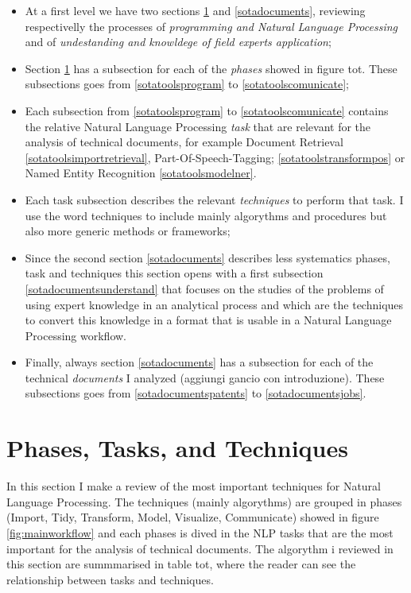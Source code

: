 \documentclass[]{book}
\providecommand{\tightlist}{%
  \setlength{\itemsep}{0pt}\setlength{\parskip}{0pt}}
\theoremstyle{definition}
\theoremstyle{definition}
\theoremstyle{definition}
\theoremstyle{remark}
\begin{document}
\begin{itemize}
\tightlist
\item
  At a first level we have two sections \ref{sotatools} and
  \ref{sotadocuments}, reviewing respectivelly the processes of
  \emph{programming and Natural Language Processing} and of
  \emph{undestanding and knowldege of field experts application};
\item
  Section \ref{sotatools} has a subsection for each of the \emph{phases}
  showed in figure tot. These subsections goes from
  \ref{sotatoolsprogram} to \ref{sotatoolscomunicate};
\item
  Each subsection from \ref{sotatoolsprogram} to
  \ref{sotatoolscomunicate} contains the relative Natural Language
  Processing \emph{task} that are relevant for the analysis of technical
  documents, for example Document Retrieval
  \ref{sotatoolsimportretrieval}, Part-Of-Speech-Tagging;
  \ref{sotatoolstransformpos} or Named Entity Recognition
  \ref{sotatoolsmodelner}.
\item
  Each task subsection describes the relevant \emph{techniques} to
  perform that task. I use the word techniques to include mainly
  algorythms and procedures but also more generic methods or frameworks;
\item
  Since the second section \ref{sotadocuments} describes less
  systematics phases, task and techniques this section opens with a
  first subsection \ref{sotadocumentsunderstand} that focuses on the
  studies of the problems of using expert knowledge in an analytical
  process and which are the techniques to convert this knowledge in a
  format that is usable in a Natural Language Processing workflow.
\item
  Finally, always section \ref{sotadocuments} has a subsection for each
  of the technical \emph{documents} I analyzed (aggiungi gancio con
  introduzione). These subsections goes from \ref{sotadocumentspatents}
  to \ref{sotadocumentsjobs}.
\end{itemize}

\section{Phases, Tasks, and Techniques}\label{sotatools}

In this section I make a review of the most important techniques for
Natural Language Processing. The techniques (mainly algorythms) are
grouped in phases (Import, Tidy, Transform, Model, Visualize,
Communicate) showed in figure \ref{fig:mainworkflow} and each phases is
dived in the NLP tasks that are the most important for the analysis of
technical documents. The algorythm i reviewed in this section are
summmarised in table tot, where the reader can see the relationship
between tasks and techniques.
\end{document}
